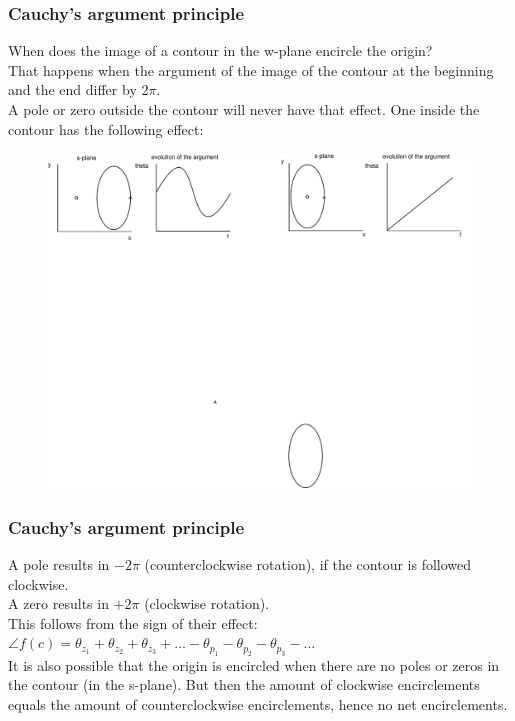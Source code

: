 \begin{frame}
	\frametitle{Cauchy's argument principle}
	When does the image of a contour in the w-plane encircle the origin?\\
	\medskip
	That happens when the argument of the image of the contour at the beginning and the end differ by $2\pi$.\\
	\medskip
	A pole or zero outside the contour will never have that effect. One inside the contour has the following effect:\\
	\medskip
	\begin{figure}
		\includegraphics[width=1\linewidth]{argument}
	\end{figure}
\end{frame}

\begin{frame}
	\frametitle{Cauchy's argument principle}
	\vspace{-4ex}
	A pole results in $-2\pi$ (counterclockwise rotation), if the contour is followed clockwise.\\
	\medskip
	A zero results in $+2\pi$ (clockwise rotation).\\
	\medskip
	This follows from the sign of their effect: $\angle f(c) = \theta_{z_{1}}+\theta_{z_{2}}+\theta_{z_{3}}+...-\theta_{p_{1}}-\theta_{p_{2}}-\theta_{p_{3}}-...$\\
	\bigskip
	It is also possible that the origin is encircled when there are no poles or zeros in the contour (in the s-plane). But then the amount of clockwise encirclements equals the amount of counterclockwise encirclements, hence no net encirclements.
\end{frame}

